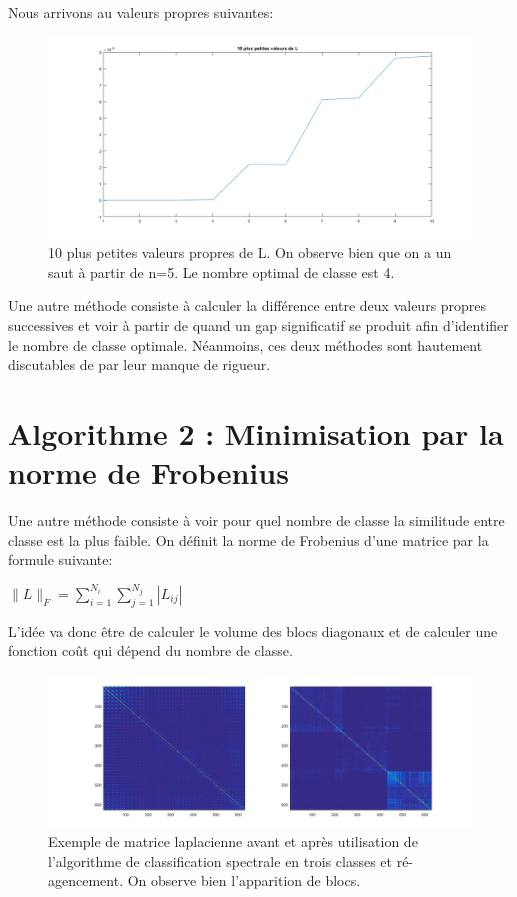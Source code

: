 \medskip

Nous arrivons au valeurs propres suivantes:

\medskip

\begin{figure}[H]
\centering
    \includegraphics[scale=0.4,angle=0]{Images/Ngap.png}
    \caption{10 plus petites valeurs propres de L. On observe bien que on a un saut à partir de n=5. Le nombre optimal de classe est 4.}
    \label{fig:Ngap}
\end{figure} 

\medskip

Une autre méthode consiste à calculer la différence entre deux valeurs propres successives et voir à partir de quand un gap significatif se produit afin d'identifier le nombre de classe optimale. Néanmoins, ces deux méthodes sont hautement discutables de par leur manque de rigueur.


\section{Algorithme 2 : Minimisation par la norme de Frobenius}

Une autre méthode consiste à voir pour quel nombre de classe la similitude entre classe est la plus faible.
On définit la norme de Frobenius d'une matrice par la formule suivante:

\medskip
$
\|{L}\|_F = \sum_{i=1}^{N_i}  \sum_{j=1}^{N_j} |L_{ij}|
$
\medskip

L'idée va donc être de calculer le volume des blocs diagonaux et de calculer une fonction coût qui dépend du nombre de classe.

\begin{figure}[H]
\centering
    \includegraphics[scale=0.4,angle=0]{Images/L.png}
    \caption{Exemple de matrice laplacienne avant et après utilisation de l'algorithme de classification spectrale en trois classes et ré-agencement. On observe bien l'apparition de blocs.}
    \label{fig:L}
\end{figure} 

